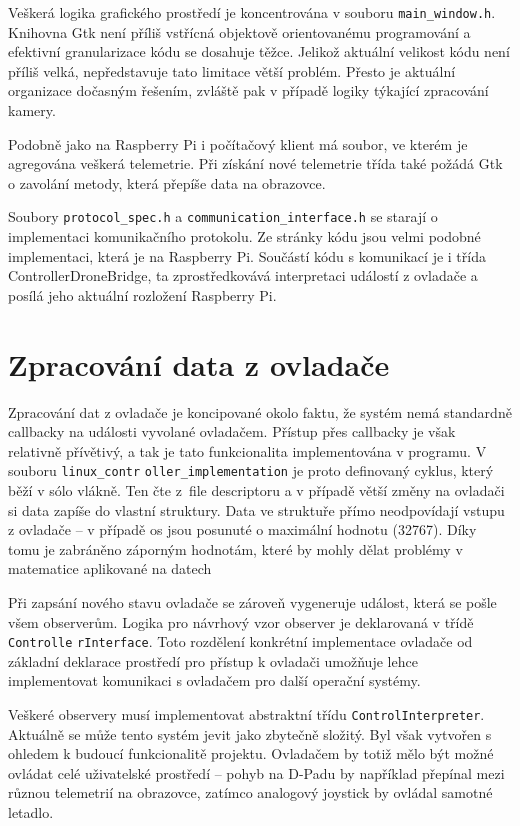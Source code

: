 \documentclass[a4paper,oneside,12pt]{report}
\begin{document}
Veškerá logika grafického prostředí je koncentrována v souboru \verb|main_window.h|.
Knihovna Gtk není příliš vstřícná objektově orientovanému programování a efektivní granularizace kódu se dosahuje těžce.
Jelikož aktuální velikost kódu není příliš velká, nepředstavuje tato limitace větší problém.
Přesto je aktuální organizace dočasným řešením, zvláště pak v případě logiky týkající zpracování kamery.

Podobně jako na Raspberry Pi i počítačový klient má soubor, ve kterém je agregována veškerá telemetrie.
Při získání nové telemetrie třída také požádá Gtk o zavolání metody, která přepíše data na obrazovce.

Soubory \verb|protocol_spec.h| a \verb|communication_interface.h| se starají o implementaci komunikačního protokolu.
Ze stránky kódu jsou velmi podobné implementaci, která je na Raspberry Pi.
Součástí kódu s komunikací je i třída ControllerDroneBridge, ta zprostředkovává interpretaci událostí z ovladače a posílá jeho aktuální rozložení Raspberry Pi.

\section{Zpracování data z ovladače}

Zpracování dat z ovladače je koncipované okolo faktu, že systém nemá standardně callbacky na události vyvolané ovladačem.
Přístup přes callbacky je však relativně přívětivý, a tak je tato funkcionalita implementována v programu.
V souboru \verb|linux_contr|
\verb|oller_implementation| je proto definovaný cyklus, který běží v sólo vlákně.
Ten čte z~file descriptoru a v případě větší změny na ovladači si data zapíše do vlastní struktury.
Data ve struktuře přímo neodpovídají vstupu z ovladače -- v případě os jsou posunuté o maximální hodnotu (32767).
Díky tomu je zabráněno záporným hodnotám, které by mohly dělat problémy v matematice aplikované na datech

Při zapsání nového stavu ovladače se zároveň vygeneruje událost, která se pošle všem observerům.
Logika pro návrhový vzor observer je deklarovaná v třídě \verb|Controlle|
\verb|rInterface|.
Toto rozdělení konkrétní implementace ovladače od základní deklarace prostředí pro přístup k ovladači umožňuje lehce implementovat komunikaci s ovladačem pro další operační systémy.

Veškeré observery musí implementovat abstraktní třídu \verb|ControlInterpreter|.
Aktuálně se může tento systém jevit jako zbytečně složitý.
Byl však vytvořen s ohledem k budoucí funkcionalitě projektu.
Ovladačem by totiž mělo být možné ovládat celé uživatelské prostředí -- pohyb na D-Padu by například přepínal mezi různou telemetrií na obrazovce, zatímco analogový joystick by ovládal samotné letadlo.
\end{document}
